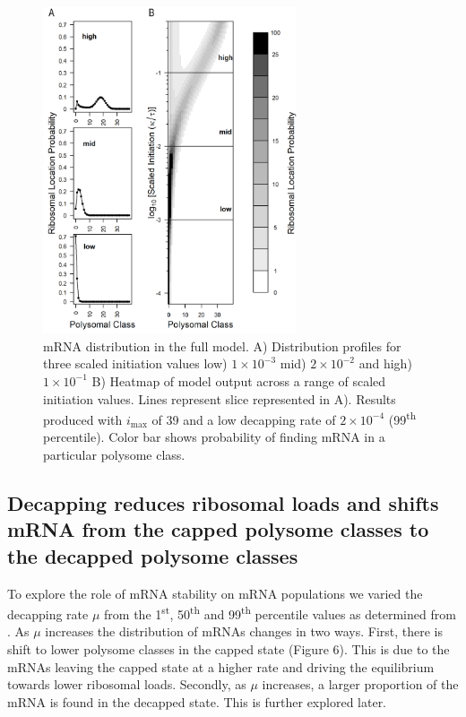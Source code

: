 \documentclass[a4,center,fleqn,nocrop]{NAR}
\newcommand{\imax}{\ensuremath{{i_{\max}}}\xspace}
\begin{document}
\begin{figure}[!ht]
\begin{center}
\includegraphics[width=75mm]{Images/2023-07-09_Figure1_DIIvsDDI_medianlength_low_marking_with_labels.png}
\caption{mRNA distribution in the full model. A) Distribution profiles for three scaled initiation values low) $1\times 10^{-3}$ mid) $2\times 10^{-2}$ and high) $1\times 10^{-1}$ B) Heatmap of model output across a range of scaled initiation values. Lines represent slice represented in A). Results produced with \imax of 39 and a low decapping rate of $2\times10^{-4}$  (99\textsuperscript{th} percentile). Color bar shows probability of finding mRNA in a particular polysome class.}
\end{center}
\end{figure}


\subsection{Decapping reduces ribosomal loads and shifts mRNA from the capped polysome classes to the decapped polysome classes}

To explore the role of mRNA stability on mRNA populations we varied the decapping rate $\mu$ from the 1\textsuperscript{st}, 50\textsuperscript{th} and 99\textsuperscript{th} percentile values as determined from  \citep{RN27}.
As $\mu$ increases the distribution of mRNAs changes in two ways. 
First, there is shift to lower polysome classes in the capped state (Figure 6).
This is due to the mRNAs leaving the capped state at a higher rate and driving the equilibrium towards lower ribosomal loads. 
Secondly, as $\mu$ increases, a larger proportion of the mRNA is found in the decapped state. This is further explored later. 
\end{document}
